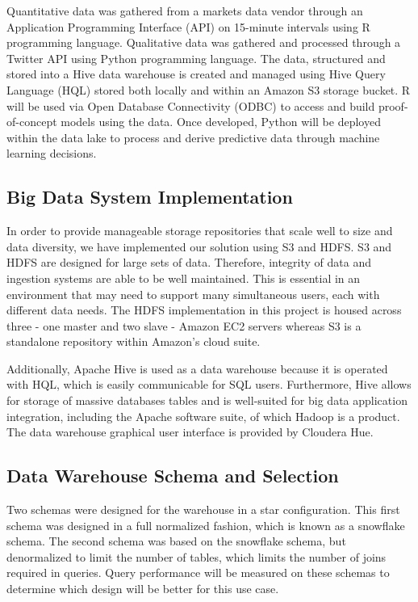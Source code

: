 \documentclass[journal]{IEEEtran}
\begin{document}
	Quantitative data was gathered from a markets data vendor through an
	Application Programming Interface (API) on 15-minute intervals using R
	programming language. 
	Qualitative data was gathered and processed through a Twitter API
	using Python programming language. 
	The data, structured and stored into a Hive data warehouse is created and
	managed using Hive Query Language (HQL) stored both locally and
	within an Amazon S3 storage bucket. 
	R will be used via Open Database Connectivity (ODBC) to access and
	build proof-of-concept models using the data. Once developed,
	Python will be deployed within the data lake to process and
	derive predictive data through machine learning decisions.
	
	\subsection{Big Data System Implementation}
	
	In order to provide manageable storage repositories that scale 
	well to size and data diversity, 
	we have implemented our solution using S3 and HDFS. 
	S3 and HDFS are designed for large sets of data. 
	Therefore, integrity of data and ingestion systems are able
	to be well maintained. 
	This is essential in an environment that may need to support 
	many simultaneous users, each with different data needs. 
	The HDFS implementation in this project is housed across three 
	- one master and two slave - Amazon EC2 servers 
	whereas S3 is a standalone repository within Amazon's cloud suite.
	
	Additionally, Apache Hive is used as a data warehouse 
	because it is operated with HQL, 
	which is easily communicable for SQL users. 
	Furthermore, Hive allows for storage of massive databases tables and
	is well-suited for big data application integration, 
	including the Apache software suite, of which Hadoop is a product. 
	The data warehouse graphical user interface is provided by Cloudera Hue.
	
	\subsection{Data Warehouse Schema and Selection}
	
	Two schemas were designed for the warehouse in a star configuration.
	This first schema was designed in a full normalized fashion,
	which is known as a snowflake schema.
	The second schema was based on the snowflake schema, 
	but denormalized to limit the number of tables, 
	which limits the number of joins required in queries.
	Query performance will be measured on these schemas to determine
	which design will be better for this use case. 
	
\end{document}
